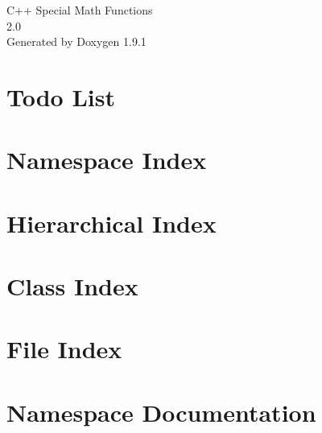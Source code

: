 \let\mypdfximage\pdfximage\def\pdfximage{\immediate\mypdfximage}\documentclass[twoside]{book}
\newcommand{\+}{\discretionary{\mbox{\scriptsize$\hookleftarrow$}}{}{}}
\newcommand{\clearemptydoublepage}{%
  \newpage{\pagestyle{empty}\cleardoublepage}%
}
\begin{document}
\raggedbottom

\hypersetup{pageanchor=false,
             bookmarksnumbered=true,
             pdfencoding=unicode
            }
\begin{titlepage}
\vspace*{7cm}
\begin{center}%
{\Large C++ Special Math Functions \\[1ex]\large 2.\+0 }\\
\vspace*{1cm}
{\large Generated by Doxygen 1.9.1}\\
\end{center}
\end{titlepage}
\clearemptydoublepage
{}
\tableofcontents
\clearemptydoublepage
{}
\hypersetup{pageanchor=true}

\chapter{Todo List}
\label{todo}

\chapter{Namespace Index}

\chapter{Hierarchical Index}

\chapter{Class Index}

\chapter{File Index}

\chapter{Namespace Documentation}


\end{document}
